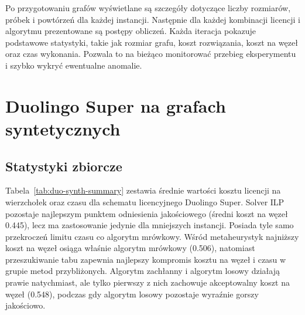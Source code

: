 Po przygotowaniu grafów wyświetlane są szczegóły dotyczące liczby rozmiarów, próbek i powtórzeń dla każdej instancji. Następnie dla każdej kombinacji licencji i algorytmu prezentowane są postępy obliczeń. Każda iteracja pokazuje podstawowe statystyki, takie jak rozmiar grafu, koszt rozwiązania, koszt na węzeł oraz czas wykonania. Pozwala to na bieżąco monitorować przebieg eksperymentu i szybko wykryć ewentualne anomalie.

\section{Duolingo Super na grafach syntetycznych}

\subsection{Statystyki zbiorcze}
Tabela~\ref{tab:duo-synth-summary} zestawia średnie wartości kosztu licencji na wierzchołek oraz czasu dla schematu licencyjnego Duolingo Super. Solver ILP pozostaje najlepszym punktem odniesienia jakościowego (średni koszt na węzeł 0.445), lecz ma zastosowanie jedynie dla mniejszych instancji. Posiada tyle samo przekroczeń limitu czasu co algorytm mrówkowy. Wśród metaheurystyk najniższy koszt na węzeł osiąga właśnie algorytm mrówkowy (0.506), natomiast przeszukiwanie tabu zapewnia najlepszy kompromis kosztu na węzeł i czasu w grupie metod przybliżonych. Algorytm zachłanny i algorytm losowy działają prawie natychmiast, ale tylko pierwszy z nich zachowuje akceptowalny koszt na węzeł (0.548), podczas gdy algorytm losowy pozostaje wyraźnie gorszy jakościowo.

